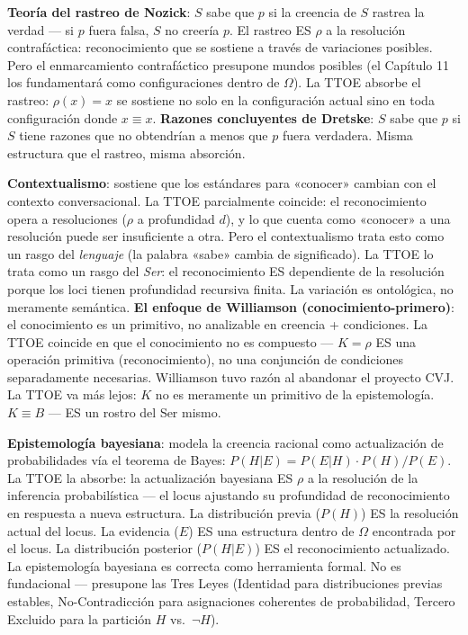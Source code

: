 \documentclass[10pt, openany, oneside]{book}
\begin{document}
\textbf{Teoría del rastreo de Nozick}: $S$ sabe que $p$ si la creencia de $S$ rastrea la verdad --- si $p$ fuera falsa, $S$ no creería $p$. El rastreo ES $\rho$ a la resolución contrafáctica: reconocimiento que se sostiene a través de variaciones posibles. Pero el enmarcamiento contrafáctico presupone mundos posibles (el Capítulo 11 los fundamentará como configuraciones dentro de $\Omega$). La TTOE absorbe el rastreo: $\rho(x) = x$ se sostiene no solo en la configuración actual sino en toda configuración donde $x \equiv x$. \textbf{Razones concluyentes de Dretske}: $S$ sabe que $p$ si $S$ tiene razones que no obtendrían a menos que $p$ fuera verdadera. Misma estructura que el rastreo, misma absorción.

\textbf{Contextualismo}: sostiene que los estándares para «conocer» cambian con el contexto conversacional. La TTOE parcialmente coincide: el reconocimiento opera a resoluciones ($\rho$ a profundidad $d$), y lo que cuenta como «conocer» a una resolución puede ser insuficiente a otra. Pero el contextualismo trata esto como un rasgo del \textit{lenguaje} (la palabra «sabe» cambia de significado). La TTOE lo trata como un rasgo del \textit{Ser}: el reconocimiento ES dependiente de la resolución porque los loci tienen profundidad recursiva finita. La variación es ontológica, no meramente semántica. \textbf{El enfoque de Williamson (conocimiento-primero)}: el conocimiento es un primitivo, no analizable en creencia + condiciones. La TTOE coincide en que el conocimiento no es compuesto --- $K = \rho$ ES una operación primitiva (reconocimiento), no una conjunción de condiciones separadamente necesarias. Williamson tuvo razón al abandonar el proyecto CVJ. La TTOE va más lejos: $K$ no es meramente un primitivo de la epistemología. $K \equiv B$ --- ES un rostro del Ser mismo.

\textbf{Epistemología bayesiana}: modela la creencia racional como actualización de probabilidades vía el teorema de Bayes: $P(H|E) = P(E|H) \cdot P(H) / P(E)$. La TTOE la absorbe: la actualización bayesiana ES $\rho$ a la resolución de la inferencia probabilística --- el locus ajustando su profundidad de reconocimiento en respuesta a nueva estructura. La distribución previa ($P(H)$) ES la resolución actual del locus. La evidencia ($E$) ES una estructura dentro de $\Omega$ encontrada por el locus. La distribución posterior ($P(H|E)$) ES el reconocimiento actualizado. La epistemología bayesiana es correcta como herramienta formal. No es fundacional --- presupone las Tres Leyes (Identidad para distribuciones previas estables, No-Contradicción para asignaciones coherentes de probabilidad, Tercero Excluido para la partición $H$ vs.\ $\neg H$).
\end{document}
